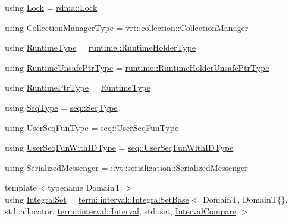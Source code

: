 \begin{DoxyCompactItemize}
using \hyperlink{namespacevt_ae3eb725d1ffe20cd7d82a8c42f3e52ef}{Lock} = \hyperlink{namespacevt_1_1rdma_ac5c20b41a653e520b6305d4d454ecb70}{rdma\+::\+Lock}
\item 
using \hyperlink{namespacevt_a290f7e8941f9f411b54cdb15b6cea107}{Collection\+Manager\+Type} = \hyperlink{structvt_1_1vrt_1_1collection_1_1_collection_manager}{vrt\+::collection\+::\+Collection\+Manager}
\item 
using \hyperlink{namespacevt_a5c1db2c048b259a2ba8961766ddb9278}{Runtime\+Type} = \hyperlink{namespacevt_1_1runtime_ab09d044cce417fbcdb7e1e29b7aabbc3}{runtime\+::\+Runtime\+Holder\+Type}
\item 
using \hyperlink{namespacevt_a8019b70cc4b9b0833c38559c85dfd53b}{Runtime\+Unsafe\+Ptr\+Type} = \hyperlink{namespacevt_1_1runtime_a69931905b04961a874e4a70a43083a83}{runtime\+::\+Runtime\+Holder\+Unsafe\+Ptr\+Type}
\item 
using \hyperlink{namespacevt_a0ce60e0299d8fa32223b3b9ffa0af466}{Runtime\+Ptr\+Type} = \hyperlink{namespacevt_a5c1db2c048b259a2ba8961766ddb9278}{Runtime\+Type}
\item 
using \hyperlink{namespacevt_a98ecd5e376bd317a21b245064361240e}{Seq\+Type} = \hyperlink{namespacevt_1_1seq_a3b612da217ac669d39c159f134ab8434}{seq\+::\+Seq\+Type}
\item 
using \hyperlink{namespacevt_affe11140b7cc6953030f1f158b40750c}{User\+Seq\+Fun\+Type} = \hyperlink{namespacevt_1_1seq_aeb4674d25dcb5d27248b68ec83fad2b6}{seq\+::\+User\+Seq\+Fun\+Type}
\item 
using \hyperlink{namespacevt_a3170103960b4d8f8a0f722750bc0dcc9}{User\+Seq\+Fun\+With\+I\+D\+Type} = \hyperlink{namespacevt_1_1seq_a1a58d0ebe1d6bbed8438607a9c717779}{seq\+::\+User\+Seq\+Fun\+With\+I\+D\+Type}
\item 
using \hyperlink{namespacevt_a490b7af99bdeb06e988d94a7ab389b43}{Serialized\+Messenger} = \+::\hyperlink{structvt_1_1serialization_1_1_serialized_messenger}{vt\+::serialization\+::\+Serialized\+Messenger}
\item 
{\footnotesize template$<$typename DomainT $>$ }\\using \hyperlink{namespacevt_af8fc7210a3d8e598330cf3375857ef1e}{Integral\+Set} = \hyperlink{structvt_1_1term_1_1interval_1_1_integral_set_base}{term\+::interval\+::\+Integral\+Set\+Base}$<$ DomainT, DomainT\{\}, std\+::allocator, \hyperlink{structvt_1_1term_1_1interval_1_1_interval}{term\+::interval\+::\+Interval}, std\+::set, \hyperlink{namespacevt_ab51b754f1d22841f555246195fab9d41}{Interval\+Compare} $>$
\item 

\end{DoxyCompactItemize}
